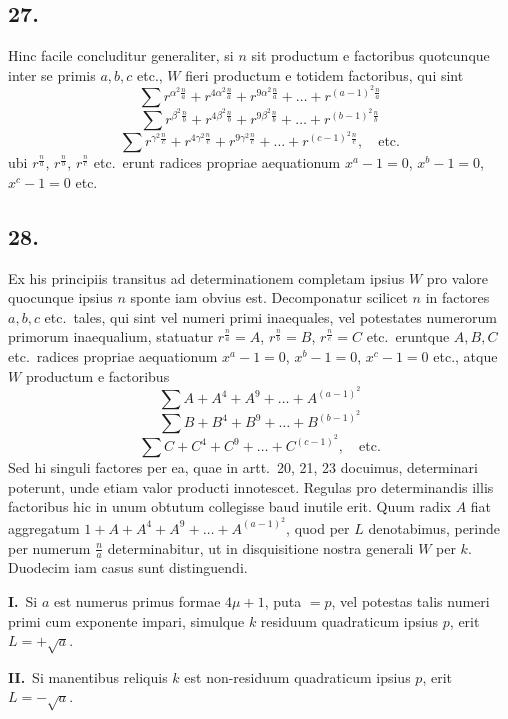 \documentclass[12pt,a4paper]{article}
\theoremstyle{plain}
\begin{document}
\subsection*{27.}

Hinc facile concluditur generaliter, si $n$ sit productum e factoribus quotcunque inter se primis $a, b, c$ etc., $W$ fieri productum e totidem factoribus, qui sint
\[
\sum r^{\alpha^2 \frac{n}{a}} + r^{4\alpha^2 \frac{n}{a}} + r^{9\alpha^2 \frac{n}{a}} + \ldots + r^{(a-1)^2 \frac{n}{a}}
\]
\[
\sum r^{\beta^2 \frac{n}{b}} + r^{4\beta^2 \frac{n}{b}} + r^{9\beta^2 \frac{n}{b}} + \ldots + r^{(b-1)^2 \frac{n}{b}}
\]
\[
\sum r^{\gamma^2 \frac{n}{c}} + r^{4\gamma^2 \frac{n}{c}} + r^{9\gamma^2 \frac{n}{c}} + \ldots + r^{(c-1)^2 \frac{n}{c}}, \quad \text{etc.}
\]
ubi $r^{\frac{n}{a}}$, $r^{\frac{n}{b}}$, $r^{\frac{n}{c}}$ etc.\ erunt radices propriae aequationum $x^a - 1 = 0$, $x^b - 1 = 0$, $x^c - 1 = 0$ etc.

\subsection*{28.}

Ex his principiis transitus ad determinationem completam ipsius $W$ pro valore quocunque ipsius $n$ sponte iam obvius est. Decomponatur scilicet $n$ in factores $a, b, c$ etc.\ tales, qui sint vel numeri primi inaequales, vel potestates numerorum primorum inaequalium, statuatur $r^{\frac{n}{a}} = A$, $r^{\frac{n}{b}} = B$, $r^{\frac{n}{c}} = C$ etc.\ eruntque $A, B, C$ etc.\ radices propriae aequationum $x^a - 1 = 0$, $x^b - 1 = 0$, $x^c - 1 = 0$ etc., atque $W$ productum e factoribus
\[
\sum A + A^4 + A^9 + \ldots + A^{(a-1)^2}
\]
\[
\sum B + B^4 + B^9 + \ldots + B^{(b-1)^2}
\]
\[
\sum C + C^4 + C^9 + \ldots + C^{(c-1)^2}, \quad \text{etc.}
\]
Sed hi singuli factores per ea, quae in artt.\ 20, 21, 23 docuimus, determinari poterunt, unde etiam valor producti innotescet. Regulas pro determinandis illis factoribus hic in unum obtutum collegisse baud inutile erit. Quum radix $A$ fiat aggregatum $1 + A + A^4 + A^9 + \ldots + A^{(a-1)^2}$, quod per $L$ denotabimus, perinde per numerum $\frac{n}{a}$ determinabitur, ut in disquisitione nostra generali $W$ per $k$. Duodecim iam casus sunt distinguendi.

\medskip
\noindent\textbf{I.}\ Si $a$ est numerus primus formae $4\mu+1$, puta $= p$, vel potestas talis numeri primi cum exponente impari, simulque $k$ residuum quadraticum ipsius $p$, erit $L = +\sqrt{a}$.

\medskip
\noindent\textbf{II.}\ Si manentibus reliquis $k$ est non-residuum quadraticum ipsius $p$, erit $L = -\sqrt{a}$.
\end{document}
